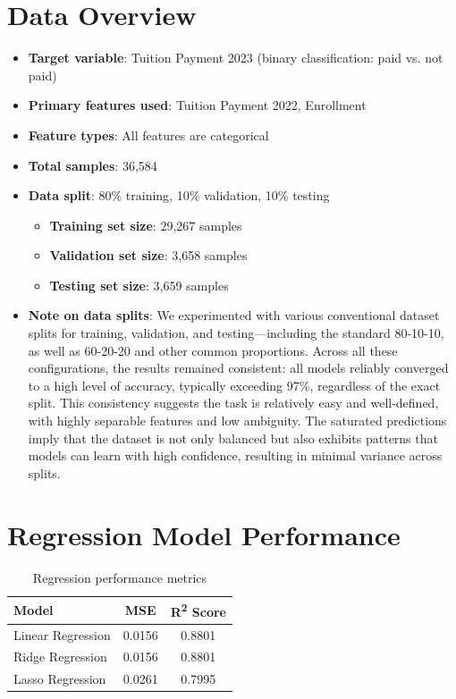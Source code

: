 \documentclass{article}
\begin{document}
\section{Data Overview}
\begin{itemize}
    \item \textbf{Target variable}: Tuition Payment 2023 (binary classification: paid vs. not paid)
    \item \textbf{Primary features used}: Tuition Payment 2022, Enrollment
    \item \textbf{Feature types}: All features are categorical
    \item \textbf{Total samples}: 36,584
    \item \textbf{Data split}: 80\% training, 10\% validation, 10\% testing
    \begin{itemize}
        \item \textbf{Training set size}: 29,267 samples
        \item \textbf{Validation set size}: 3,658 samples
        \item \textbf{Testing set size}: 3,659 samples
    \end{itemize}
    \item \textbf{Note on data splits}: We experimented with various conventional dataset splits for training, validation, and testing—including the standard 80-10-10, as well as 60-20-20 and other common proportions. Across all these configurations, the results remained consistent: all models reliably converged to a high level of accuracy, typically exceeding 97\%, regardless of the exact split. This consistency suggests the task is relatively easy and well-defined, with highly separable features and low ambiguity. The saturated predictions imply that the dataset is not only balanced but also exhibits patterns that models can learn with high confidence, resulting in minimal variance across splits.
\end{itemize}


\newpage
\section{Regression Model Performance}
\begin{table}[H]
\centering
\begin{tabular}{lcc}
\toprule
\textbf{Model} & \textbf{MSE} & \textbf{R\textsuperscript{2} Score} \\
\midrule
Linear Regression & 0.0156 & 0.8801 \\
Ridge Regression & 0.0156 & 0.8801 \\
Lasso Regression & 0.0261 & 0.7995 \\
\bottomrule
\end{tabular}
\caption{Regression performance metrics}
\label{tab:regression_performance}
\end{table}
\end{document}
